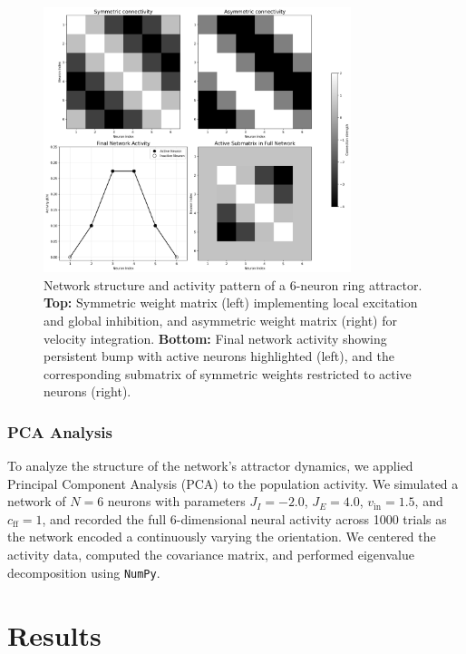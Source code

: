 \documentclass[11pt,a4paper]{article}
\begin{document}
\begin{figure}[htbp]
    \centering
    \includegraphics[width=0.8\textwidth]{connectivity_and_activity.png}
    \caption{Network structure and activity pattern of a 6-neuron ring attractor. \textbf{Top:} Symmetric weight matrix (left) implementing local excitation and global inhibition, and asymmetric weight matrix (right) for velocity integration. \textbf{Bottom:} Final network activity showing persistent bump with active neurons highlighted (left), and the corresponding submatrix of symmetric weights restricted to active neurons (right).}
    \label{fig:network_structure}
\end{figure}


\subsubsection*{PCA Analysis}

To analyze the structure of the network’s attractor dynamics, we applied Principal Component Analysis (PCA) to the population activity. We simulated a network of $N = 6$ neurons with parameters $J_I = -2.0$, $J_E = 4.0$, $v_{\text{in}} = 1.5$, and $c_{\text{ff}} = 1$, and recorded the full 6-dimensional neural activity across 1000 trials as the network encoded a continuously varying the orientation. 
We centered the activity data, computed the covariance matrix, and performed eigenvalue decomposition using \texttt{NumPy}. 



\section{Results}
\end{document}
